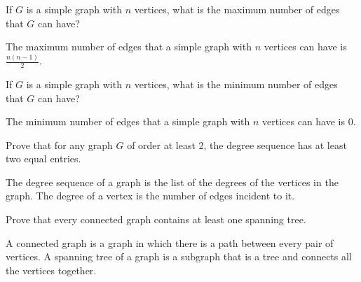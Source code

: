 \documentclass[a4paper,10pt]{exam}
\title{\papertitle}
\date{February}
\begin{document}
\maketitle



\begin{questions} 
	\question If $G$ is a simple graph with $n$ vertices, what is the maximum number of edges that $G$ can have?
    \begin{solution}
        The maximum number of edges that a simple graph with $n$ vertices can have is $\frac{n(n-1)}{2}$.
    \end{solution}
    \question If $G$ is a simple graph with $n$ vertices, what is the minimum number of edges that $G$ can have?
    \begin{solution}
        The minimum number of edges that a simple graph with $n$ vertices can have is 0.
    \end{solution}
    \question Prove that for any graph $G$ of order at least 2, the degree sequence has at least two equal entries.
    \begin{solution}
        The degree sequence of a graph is the list of the degrees of the vertices in the graph. The degree of a vertex is the number of edges incident to it. 
    \end{solution}
    \question Prove that every connected graph contains at least one spanning tree. 
    \begin{solution}
        A connected graph is a graph in which there is a path between every pair of vertices. A spanning tree of a graph is a subgraph that is a tree and connects all the vertices together. 
        \begin{parts}

\end{parts}
\end{solution}
\end{questions}
\end{document}
